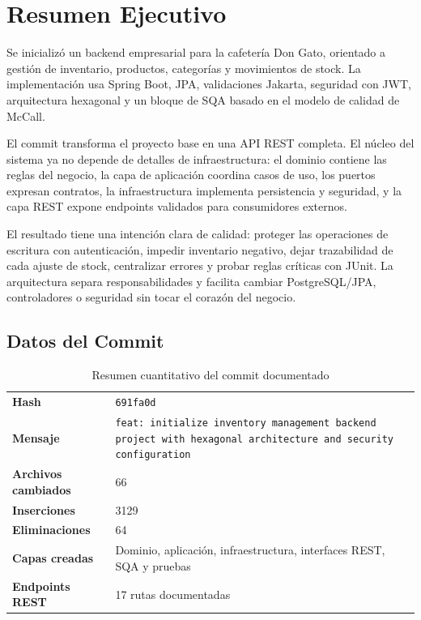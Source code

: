 \documentclass[11pt,oneside]{report}
\begin{document}
\tableofcontents
\listoftables
\listoffigures
\clearpage
{}

\chapter{Resumen Ejecutivo}

\begin{infobox}
Se inicializó un backend empresarial para la cafetería Don Gato, orientado a gestión de inventario, productos, categorías y movimientos de stock. La implementación usa Spring Boot, JPA, validaciones Jakarta, seguridad con JWT, arquitectura hexagonal y un bloque de SQA basado en el modelo de calidad de McCall.
\end{infobox}

El commit transforma el proyecto base en una API REST completa. El núcleo del sistema ya no depende de detalles de infraestructura: el dominio contiene las reglas del negocio, la capa de aplicación coordina casos de uso, los puertos expresan contratos, la infraestructura implementa persistencia y seguridad, y la capa REST expone endpoints validados para consumidores externos.

El resultado tiene una intención clara de calidad: proteger las operaciones de escritura con autenticación, impedir inventario negativo, dejar trazabilidad de cada ajuste de stock, centralizar errores y probar reglas críticas con JUnit. La arquitectura separa responsabilidades y facilita cambiar PostgreSQL/JPA, controladores o seguridad sin tocar el corazón del negocio.

\section{Datos del Commit}

\begin{table}[h!]
\centering
\caption{Resumen cuantitativo del commit documentado}
\begin{tabularx}{\textwidth}{>{\bfseries}l X}
\toprule
Hash & \texttt{691fa0d}\\
Mensaje & \texttt{feat: initialize inventory management backend project with hexagonal architecture and security configuration}\\
Archivos cambiados & 66\\
Inserciones & 3129\\
Eliminaciones & 64\\
Capas creadas & Dominio, aplicación, infraestructura, interfaces REST, SQA y pruebas\\
Endpoints REST & 17 rutas documentadas\\
\bottomrule
\end{tabularx}
\end{table}
\end{document}
